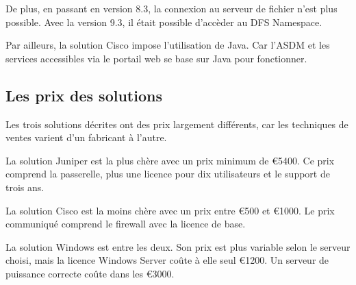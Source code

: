 De plus, en passant en version 8.3, la connexion au serveur de fichier n'est plus possible.
Avec la version 9.3, il était possible d'accèder au DFS Namespace.

Par ailleurs, la solution Cisco impose l'utilisation de Java.
Car l'ASDM et les services accessibles via le portail web se base sur Java pour fonctionner.

\subsection{Les prix des solutions}
Les trois solutions décrites ont des prix largement différents, car les techniques de ventes varient d'un fabricant à l'autre.

La solution Juniper est la plus chère avec un prix minimum de \euro{5400}.
Ce prix comprend la passerelle, plus une licence pour dix utilisateurs et le support de trois ans.

La solution Cisco est la moins chère avec un prix entre \euro{500} et \euro{1000}.
Le prix communiqué comprend le firewall avec la licence de base.

La solution Windows est entre les deux.
Son prix est plus variable selon le serveur choisi, mais la licence Windows Server coûte à elle seul \euro{1200}.
Un serveur de puissance correcte coûte dans les \euro{3000}.


